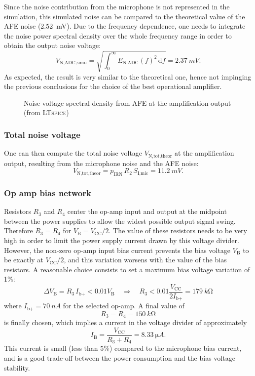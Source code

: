 \documentclass{EPL-master-thesis-covers-EN}
\newcommand{\te}[1]{\textrm{#1}}
\begin{document}
Since the noise contribution from the microphone is not represented in the simulation, this simulated noise can be compared to the theoretical value of the AFE noise (\SI{2.52}{mV}). Due to the frequency dependence, one needs to integrate the noise power spectral density over the whole frequency range in order to obtain the output noise voltage:
\[
 V_\te{N,ADC,simu} = \sqrt{\int_{0}^{\infty} E_\te{N,ADC}(f)^2 \, \te{d}f} = \SI{2.37}{mV}.
\]
As expected, the result is very similar to the theoretical one, hence not impinging the previous conclusions for the choice of the best operational amplifier.


\begin{figure}[H]
    \centering
    
    \caption{Noise voltage spectral density from AFE at the amplification output (from \textsc{LTspice})}
    \label{fig:output_noise_op_amp_freq}
\end{figure}

\subsubsection*{Total noise voltage}

One can then compute the total noise voltage $V_\te{N,tot,theor}$ at the amplification output, resulting from the microphone noise and the AFE noise:
\[
 V_\te{N,tot,theor} = p_\te{IRN} \, R_2\,S_{\te{I,mic}} = \SI{11.2}{mV}.
\]


\subsubsection*{Op amp bias network}

Resistors $R_3$ and $R_4$ center the op-amp input and output at the midpoint between the power supplies to allow the widest possible output signal swing. Therefore $R_3 = R_4$ for $V_\te{B} = V_\te{CC} / 2$. The value of these resistors needs to be very high in order to limit the power supply current drawn by this voltage divider. However, the non-zero op-amp input bias current prevents the bias voltage $V_\te{B}$ to be exactly at $V_\te{CC} / 2$, and this variation worsens with the value of the bias resistors. A reasonable choice consists to set a maximum bias voltage variation of 1\%:
\[
 \Delta V_\te{B} = R_3 \, I_\te{b+} < 0.01 V_\te{B} \quad \Rightarrow \quad R_3 < 0.01 \frac{V_\te{CC}}{2I_\te{b+}} = \SI{179}{k\ohm}
\]
where $I_\te{b+} = \SI{70}{nA}$ for the selected op-amp. A final value of
\[
 R_3 = R_4 = \SI{150}{k\ohm}
\]
is finally chosen, which implies a current in the voltage divider of approximately
\[
 I_\te{B} = \frac{V_\te{CC}}{R_3 + R_4} = \SI{8.33}{\micro A}.
\]
This current is small (less than 5\%) compared to the microphone bias current, and is a good trade-off between the power consumption and the bias voltage stability.
\end{document}

